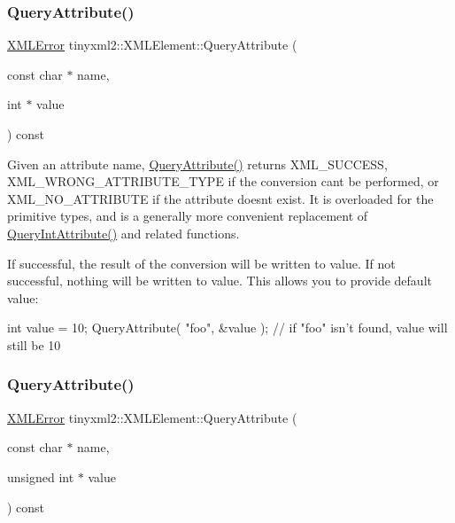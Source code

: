 \subsubsection{\texorpdfstring{Query\+Attribute()}{QueryAttribute()}\hspace{0.1cm}{\footnotesize\ttfamily [1/6]}}
{\footnotesize\ttfamily \mbox{\hyperlink{namespacetinyxml2_a1fbf88509c3ac88c09117b1947414e08}{X\+M\+L\+Error}} tinyxml2\+::\+X\+M\+L\+Element\+::\+Query\+Attribute (\begin{DoxyParamCaption}\item[{const char $\ast$}]{name,  }\item[{int $\ast$}]{value }\end{DoxyParamCaption}) const\hspace{0.3cm}{\ttfamily [inline]}}

Given an attribute name, \mbox{\hyperlink{classtinyxml2_1_1_x_m_l_element_a5b7df3bed2b8954eabf227fa204522eb}{Query\+Attribute()}} returns X\+M\+L\+\_\+\+S\+U\+C\+C\+E\+SS, X\+M\+L\+\_\+\+W\+R\+O\+N\+G\+\_\+\+A\+T\+T\+R\+I\+B\+U\+T\+E\+\_\+\+T\+Y\+PE if the conversion can\textquotesingle{}t be performed, or X\+M\+L\+\_\+\+N\+O\+\_\+\+A\+T\+T\+R\+I\+B\+U\+TE if the attribute doesn\textquotesingle{}t exist. It is overloaded for the primitive types, and is a generally more convenient replacement of \mbox{\hyperlink{classtinyxml2_1_1_x_m_l_element_a8a78bc1187c1c45ad89f2690eab567b1}{Query\+Int\+Attribute()}} and related functions.

If successful, the result of the conversion will be written to \textquotesingle{}value\textquotesingle{}. If not successful, nothing will be written to \textquotesingle{}value\textquotesingle{}. This allows you to provide default value\+:

\begin{DoxyVerb}int value = 10;
QueryAttribute( "foo", &value );        // if "foo" isn't found, value will still be 10
\end{DoxyVerb}
 \mbox{\label{classtinyxml2_1_1_x_m_l_element_a432276ea6e034cad19ad66de887ee13c}} 
\subsubsection{\texorpdfstring{Query\+Attribute()}{QueryAttribute()}\hspace{0.1cm}{\footnotesize\ttfamily [2/6]}}
{\footnotesize\ttfamily \mbox{\hyperlink{namespacetinyxml2_a1fbf88509c3ac88c09117b1947414e08}{X\+M\+L\+Error}} tinyxml2\+::\+X\+M\+L\+Element\+::\+Query\+Attribute (\begin{DoxyParamCaption}\item[{const char $\ast$}]{name,  }\item[{unsigned int $\ast$}]{value }\end{DoxyParamCaption}) const\hspace{0.3cm}{\ttfamily [inline]}}

